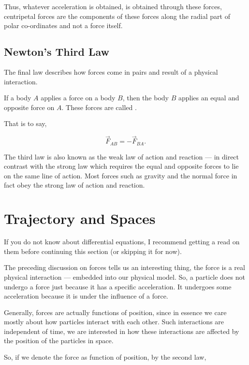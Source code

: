 Thus, whatever acceleration is obtained, is obtained through these forces, centripetal forces
are the components of these forces along the radial part of polar co-ordinates and not 
a force itself.

\subsection{Newton's Third Law}

The final law describes how forces come in pairs and result of a physical interaction.

\begin{axioms}
     If a body \(A\) applies a force on a body \(B\), then the body 
    \(B\) applies an equal and opposite force on \(A\). These forces are 
    called .
\end{axioms}

That is to say, 

\[\Vec{F}_{AB} = - \Vec{F}_{BA}.\]

The third law is also known as the weak law of action and reaction ---
in direct contrast with the strong law which requires the equal and opposite
forces to lie on the same line of action. Most forces such as gravity and the
normal force in fact obey the strong law of action and reaction.

\section{Trajectory and Spaces}

If you do not know about differential 
equations, I recommend getting a read on them before continuing this section (or skipping it for now).

The preceding discussion on forces tells us an interesting thing, 
the force is a real physical interaction --- embedded into our physical model.
So, a particle does not undergo a force just because it has a specific 
acceleration. It undergoes some acceleration because it is under the influence of a force.

Generally, forces are actually functions of position, since in essence we care mostly 
about how particles interact with each other. Such interactions are independent of time, 
we are interested in how these interactions are affected by the position of the particles in space.

So, if we denote the force as function of position, by the second law, 

